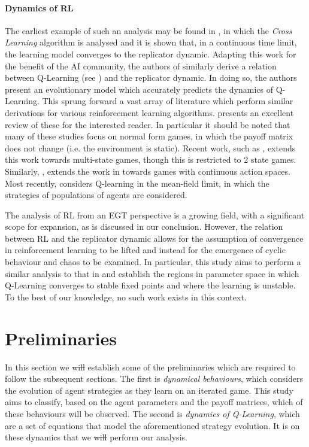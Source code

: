 \documentclass[sigconf]{aamas}
\begin{document}
\paragraph{Dynamics of RL} The earliest example of such an analysis may be found in \cite{Borgers1997}, in which the \textit{Cross Learning} algorithm is analysed and it is shown that, in a continuous time limit, the learning model converges to the replicator dynamic. Adapting this work for the benefit of the AI community, the authors of \cite{Tuyls2006AnGames} similarly derive a relation between Q-Learning (see \cite{Barber2012}) and the replicator dynamic. In doing so, the authors present an evolutionary model which accurately predicts the dynamics of Q-Learning. This sprung forward a vast array of literature which perform similar derivations for various reinforcement learning algorithms. \cite{Bloembergen2015} presents an excellent review of these for the interested reader. In particular it should be noted that many of these studies focus on normal form games, in which the payoff matrix does not change (i.e. the environment is static). Recent work, such as \cite{Hennes2008}, extends this work towards multi-state games, though this is restricted to 2 state games. Similarly, \cite{Galstyan2013}, extends the work in \cite{Tuyls2006AnGames} towards games with continuous action spaces. Most recently, \cite{Hu2019} considers Q-learning in the mean-field limit, in which the strategies of populations of agents are considered. 

The analysis of RL from an EGT perspective is a growing field, with a significant scope for expansion, as is discussed in our conclusion. 
However, the relation between RL and the replicator dynamic allows for the assumption of convergence in reinforcement learning to be lifted and instead for the emergence of cyclic behaviour and chaos to be examined. In particular, this study aims to perform a similar analysis to that in \cite{Sanders2018} and establish the regions in parameter space in which Q-Learning converges to stable fixed points and where the learning is unstable. To the best of our knowledge, no such work exists in this context. 

\section{Preliminaries}

In this section we \st{will} establish some of the preliminaries which are
required to follow the subsequent sections. The first is \textit{dynamical behaviours}, 
which considers the evolution of agent strategies as they
learn on an iterated game. This study aims to classify, based on the
agent parameters and the payoff matrices, which of these behaviours
will be observed. The second is \textit{dynamics of Q-Learning}, which are a set
of equations that model the aforementioned strategy evolution. It is
on these dynamics that we \st{will} perform our analysis.
\end{document}
